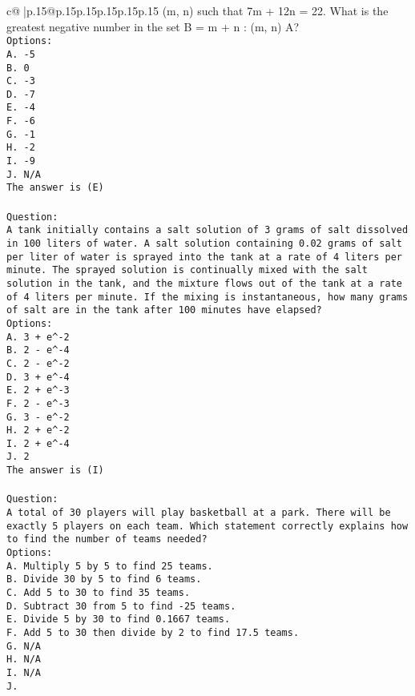 \documentclass{article}
\begin{document}
{\begin{supertabular}{c@{$\;$}|p{.15\linewidth}@{}p{.15\linewidth}p{.15\linewidth}p{.15\linewidth}p{.15\linewidth}p{.15\linewidth}}
{{{(m, n) such that 7m + 12n = 22. What is the greatest negative number in the set B = {m + n : (m, n) \in A}?\\ \tt Options:\\ \tt A. -5\\ \tt B. 0\\ \tt C. -3\\ \tt D. -7\\ \tt E. -4\\ \tt F. -6\\ \tt G. -1\\ \tt H. -2\\ \tt I. -9\\ \tt J. N/A\\ \tt The answer is (E)\\ \tt \\ \tt Question:\\ \tt A tank initially contains a salt solution of 3 grams of salt dissolved in 100 liters of water. A salt solution containing 0.02 grams of salt per liter of water is sprayed into the tank at a rate of 4 liters per minute. The sprayed solution is continually mixed with the salt solution in the tank, and the mixture flows out of the tank at a rate of 4 liters per minute. If the mixing is instantaneous, how many grams of salt are in the tank after 100 minutes have elapsed?\\ \tt Options:\\ \tt A. 3 + e^-2\\ \tt B. 2 - e^-4\\ \tt C. 2 - e^-2\\ \tt D. 3 + e^-4\\ \tt E. 2 + e^-3\\ \tt F. 2 - e^-3\\ \tt G. 3 - e^-2\\ \tt H. 2 + e^-2\\ \tt I. 2 + e^-4\\ \tt J. 2\\ \tt The answer is (I)\\ \tt \\ \tt Question:\\ \tt A total of 30 players will play basketball at a park. There will be exactly 5 players on each team. Which statement correctly explains how to find the number of teams needed?\\ \tt Options:\\ \tt A. Multiply 5 by 5 to find 25 teams.\\ \tt B. Divide 30 by 5 to find 6 teams.\\ \tt C. Add 5 to 30 to find 35 teams.\\ \tt D. Subtract 30 from 5 to find -25 teams.\\ \tt E. Divide 5 by 30 to find 0.1667 teams.\\ \tt F. Add 5 to 30 then divide by 2 to find 17.5 teams.\\ \tt G. N/A\\ \tt H. N/A\\ \tt I. N/A\\ \tt J. }}}
\end{supertabular}}
\end{document}
